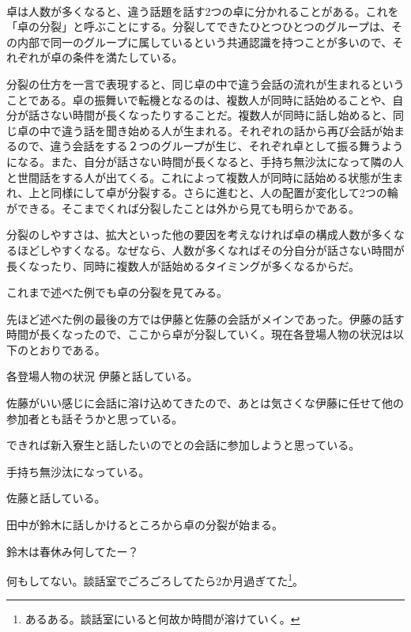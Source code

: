 \begin{multicols}{2}
\\
卓は人数が多くなると、違う話題を話す2つの卓に分かれることがある。これを「卓の分裂」と呼ぶことにする。分裂してできたひとつひとつのグループは、その内部で同一のグループに属しているという共通認識を持つことが多いので、それぞれが卓の条件を満たしている。
\par
分裂の仕方を一言で表現すると、同じ卓の中で違う会話の流れが生まれるということである。卓の振舞いで転機となるのは、複数人が同時に話始めることや、自分が話さない時間が長くなったりすることだ。複数人が同時に話し始めると、同じ卓の中で違う話を聞き始める人が生まれる。それぞれの話から再び会話が始まるので、違う会話をする２つのグループが生じ、それぞれ卓として振る舞うようになる。また、自分が話さない時間が長くなると、手持ち無沙汰になって隣の人と世間話をする人が出てくる。これによって複数人が同時に話始める状態が生まれ、上と同様にして卓が分裂する。さらに進むと、人の配置が変化して2つの輪ができる。そこまでくれば分裂したことは外から見ても明らかである。
\par
分裂のしやすさは、拡大といった他の要因を考えなければ卓の構成人数が多くなるほどしやすくなる。なぜなら、人数が多くなればその分自分が話さない時間が長くなったり、同時に複数人が話始めるタイミングが多くなるからだ。
\par
これまで述べた例でも卓の分裂を見てみる。
\par
\dotfill
\par
先ほど述べた例の最後の方では伊藤と佐藤の会話がメインであった。伊藤の話す時間が長くなったので、ここから卓が分裂していく。現在各登場人物の状況は以下のとおりである。
\begin{itembox}[l]{各登場人物の状況}
  伊藤と話している。
  
  佐藤がいい感じに会話に溶け込めてきたので、あとは気さくな伊藤に任せて他の参加者とも話そうかと思っている。
  
  できれば新入寮生と話したいのでとの会話に参加しようと思っている。
  
  手持ち無沙汰になっている。
  
  佐藤と話している。
\end{itembox}
田中が鈴木に話しかけるところから卓の分裂が始まる。

鈴木は春休み何してたー？

何もしてない。談話室でごろごろしてたら2か月過ぎてた\footnote{あるある。談話室にいると何故か時間が溶けていく。}。


\end{multicols}
